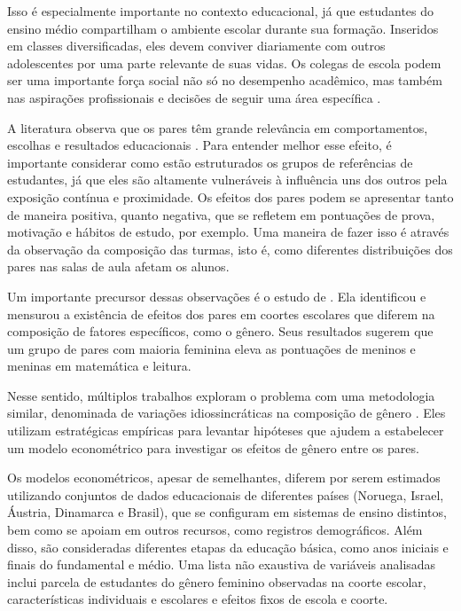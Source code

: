 Isso é especialmente importante no contexto educacional, já que estudantes do ensino médio compartilham o ambiente escolar durante sua formação. Inseridos em classes diversificadas, eles devem conviver diariamente com outros adolescentes por uma parte relevante de suas vidas. Os colegas de escola podem ser uma importante força social não só no desempenho acadêmico, mas também nas aspirações profissionais e decisões de seguir uma área específica \autocite{Tang2008}.  

A literatura observa que os pares têm grande relevância em comportamentos, escolhas e resultados educacionais \autocite{Sacerdote2014, Zimmerman2003}. Para entender melhor esse efeito, é importante considerar como estão estruturados os grupos de referências de estudantes, já que eles são altamente vulneráveis à influência uns dos outros pela exposição contínua e proximidade. Os efeitos dos pares podem se apresentar tanto de maneira positiva, quanto negativa, que se refletem em pontuações de prova, motivação e hábitos de estudo, por exemplo. Uma maneira de fazer isso é através da observação da composição das turmas, isto é, como diferentes distribuições dos pares nas salas de aula afetam os alunos.

Um importante precursor dessas observações é o estudo de \citet{Hoxby-2000}. Ela identificou e mensurou a existência de efeitos dos pares em coortes escolares que diferem na composição de fatores específicos, como o gênero. Seus resultados sugerem que um grupo de pares com maioria feminina eleva as pontuações de meninos e meninas em matemática e leitura.

Nesse sentido, múltiplos trabalhos exploram o problema com uma metodologia similar, denominada de variações idiossincráticas na composição de gênero \autocite{Schne2019, Lavy2011, Schneeweis2012, Brene2020, Borges2021}. Eles utilizam estratégicas empíricas para levantar hipóteses que ajudem a estabelecer um modelo econométrico para investigar os efeitos de gênero entre os pares. 


Os modelos econométricos, apesar de semelhantes, diferem por serem estimados utilizando conjuntos de dados educacionais de diferentes países (Noruega, Israel, Áustria, Dinamarca e Brasil), que se configuram em sistemas de ensino distintos, bem como se apoiam em outros recursos, como registros demográficos. Além disso, são consideradas diferentes etapas da educação básica, como anos iniciais e finais do fundamental e médio. Uma lista não exaustiva de variáveis analisadas inclui parcela de estudantes do gênero feminino observadas na coorte escolar, características individuais e escolares e efeitos fixos de escola e coorte. 

